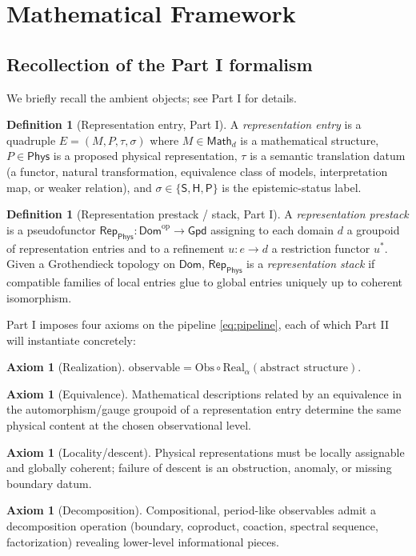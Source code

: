 \documentclass[12pt]{article}
\theoremstyle{definition}
\newtheorem{definition}[theorem]{Definition}
\newtheorem{axiom}[theorem]{Axiom}
\theoremstyle{remark}
\newcommand{\Real}{\mathrm{Real}}
\newcommand{\Obs}{\mathrm{Obs}}
\newcommand{\Dom}{\mathsf{Dom}}
\newcommand{\Math}{\mathsf{Math}}
\newcommand{\Phys}{\mathsf{Phys}}
\newcommand{\Rep}{\mathsf{Rep}}
\newcommand{\Gpd}{\mathsf{Gpd}}
\newcommand{\Slab}{\ensuremath{\mathsf{S}}}
\newcommand{\Hlab}{\ensuremath{\mathsf{H}}}
\newcommand{\Plab}{\ensuremath{\mathsf{P}}}
\begin{document}
\section{Mathematical Framework}
\label{sec:framework}

\subsection{Recollection of the Part I formalism}

We briefly recall the ambient objects; see Part I for details.

\begin{definition}[Representation entry, Part I]
\label{def:repentry}
A \emph{representation entry} is a quadruple $E = (M,P,\tau,\sigma)$ where $M\in\Math_d$ is a
mathematical structure, $P\in\Phys$ is a proposed physical representation, $\tau$ is a
semantic translation datum (a functor, natural transformation, equivalence class of models,
interpretation map, or weaker relation), and $\sigma\in\{\Slab,\Hlab,\Plab\}$ is the
epistemic-status label.
\end{definition}

\begin{definition}[Representation prestack / stack, Part I]
\label{def:prestack}
A \emph{representation prestack} is a pseudofunctor
$\Rep_{\Phys}\colon \Dom^{\mathrm{op}}\to\Gpd$ assigning to each domain $d$ a groupoid of
representation entries and to a refinement $u\colon e\to d$ a restriction functor
$u^\ast$. Given a Grothendieck topology on $\Dom$, $\Rep_{\Phys}$ is a
\emph{representation stack} if compatible families of local entries glue to global entries
uniquely up to coherent isomorphism.
\end{definition}

Part I imposes four axioms on the pipeline \eqref{eq:pipeline}, each of which Part II will
instantiate concretely:

\begin{axiom}[Realization]\label{ax:real}
$\text{observable} = \Obs\circ\Real_\alpha(\text{abstract structure})$.
\end{axiom}
\begin{axiom}[Equivalence]\label{ax:equiv}
Mathematical descriptions related by an equivalence in the automorphism/gauge groupoid of a
representation entry determine the same physical content at the chosen observational level.
\end{axiom}
\begin{axiom}[Locality/descent]\label{ax:local}
Physical representations must be locally assignable and globally coherent; failure of
descent is an obstruction, anomaly, or missing boundary datum.
\end{axiom}
\begin{axiom}[Decomposition]\label{ax:decomp}
Compositional, period-like observables admit a decomposition operation (boundary,
coproduct, coaction, spectral sequence, factorization) revealing lower-level informational
pieces.
\end{axiom}
\end{document}

